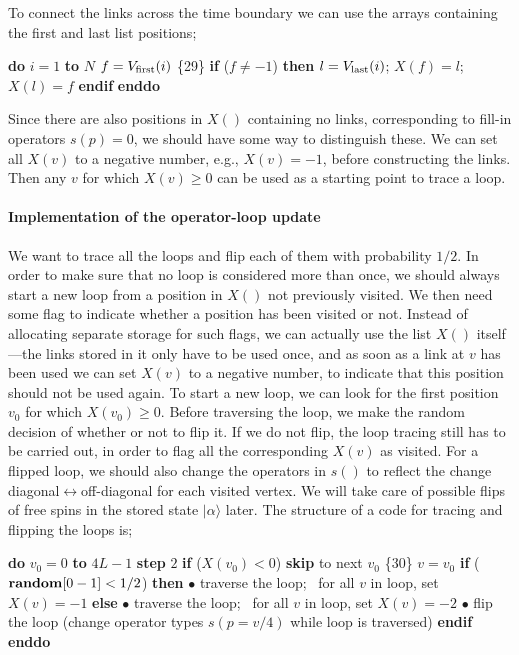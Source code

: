 \documentclass[draft,numberedheadings]{aipproc}
\newcommand{\code}{\null\vskip-2mm\noindent}
\newcommand{\br}{\hfill\break}
\newcommand{\cia}{\null\hskip5mm}
\newcommand{\cib}{\null\hskip10mm}
\newcommand{\cic}{\null\hskip15mm}
\begin{document}
\noindent
To connect the links across the time boundary we can use the arrays containing the first and last list positions;

{\code
\cia    {\bf do} $i=1$ {\bf to} $N$ \br
\cib       $f=V_{\rm first}(i)$ \hfill \{29\}\break
\cib       {\bf if} ($f\not=-1$) {\bf then} $l=V_{\rm last}(i)$; $X(f)=l$; $X(l)=f$ {\bf endif} \br
\cia    {\bf enddo} 
\code}

\noindent
Since there are also positions in $X()$ containing no links, corresponding to fill-in operators $s(p)=0$, we should have some way to distinguish these.
We can set all $X(v)$ to a negative number, e.g., $X(v)=-1$, before constructing the links. Then any $v$ for which $X(v)\ge 0$ can be used as a starting 
point to trace a loop.

\paragraph{Implementation of the operator-loop update}

We want to trace all the loops and flip each of them with probability $1/2$. In order to make sure that no loop is considered more than once, we should
always start a new loop from a position in $X()$ not previously visited. We then need some flag to indicate whether a position has been visited or not.
Instead of allocating separate storage for such flags, we can actually use the list $X()$ itself---the links stored in it only have to be used once, and
as soon as a link at $v$ has been used we can set $X(v)$ to a negative number, to indicate that this position should not be used again. To start a new loop, 
we can look for the first position $v_0$ for which $X(v_0)\ge 0$. Before traversing the loop, we make the random decision of whether or not to flip it. If we do 
not flip, the loop tracing still has to be carried out, in order to flag all the corresponding $X(v)$ as visited. For a flipped loop, we should also change the 
operators in $s()$ to reflect the change diagonal$\leftrightarrow$off-diagonal for each visited vertex. We will take care of possible flips of free spins in 
the stored state $|\alpha\rangle$ later. The structure of a code for tracing and flipping the loops is;

{\code
\cia       {\bf do} $v_0=0$ {\bf to} $4L-1$ {\bf step} $2$ \br
\cib          {\bf if} ($X(v_0)<0$) {\bf skip} {\rm to next} $v_0$     \hfill \{30\} \break
\cib          $v=v_0$ \br
\cib          {\bf if} (${\bf random}[0-1]<1/2$) {\bf then}  \br
\cic              $\bullet$ {\rm traverse the loop};~ {for all $v$ in loop, set $X(v)=-1$} \br
\cib          {\bf else}  \br
\cic              $\bullet$ {\rm traverse the loop};~ {\rm for all $v$ in loop, set $X(v)=-2$}\br
\cic              $\bullet$ {\rm flip the loop (change operator types $s(p=v/4)$ while loop is traversed)} \br
\cib          {\bf endif}  \br
\cia       {\bf enddo} 
\code}
\end{document}
